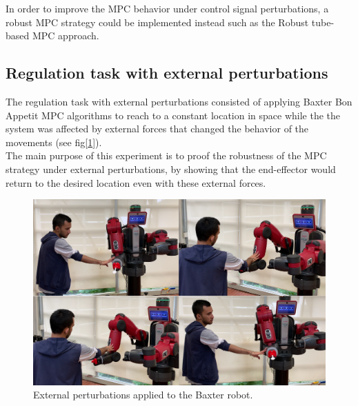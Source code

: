 \documentclass[11pt]{report} %
\begin{document}
In order to improve the MPC behavior under control signal perturbations, a robust MPC strategy could be implemented instead such as the Robust tube-based MPC approach.\\  

\subsection{Regulation task with external perturbations}

The regulation task with external perturbations consisted of applying Baxter Bon Appetit MPC algorithms to reach to a constant location in space while the the system was affected by external forces that changed the behavior of the movements (see fig[\ref{fig_real_mpc_mouth_external_perturbations_experiments}]). \\

The main purpose of this experiment is to proof the robustness of the MPC strategy under external perturbations, by showing that the end-effector would return to the desired location even with these external forces.\\ 

\begin{figure}[H]
    \centering
    \includegraphics[width=1.0\linewidth]{assets/imgs/control_theory/mpc_regulation_external_perturbations/external_perturbations_test_real.png}
    \caption{External perturbations applied to the Baxter robot.} 
    \label{fig_real_mpc_mouth_external_perturbations_experiments}
\end{figure}
\end{document}
